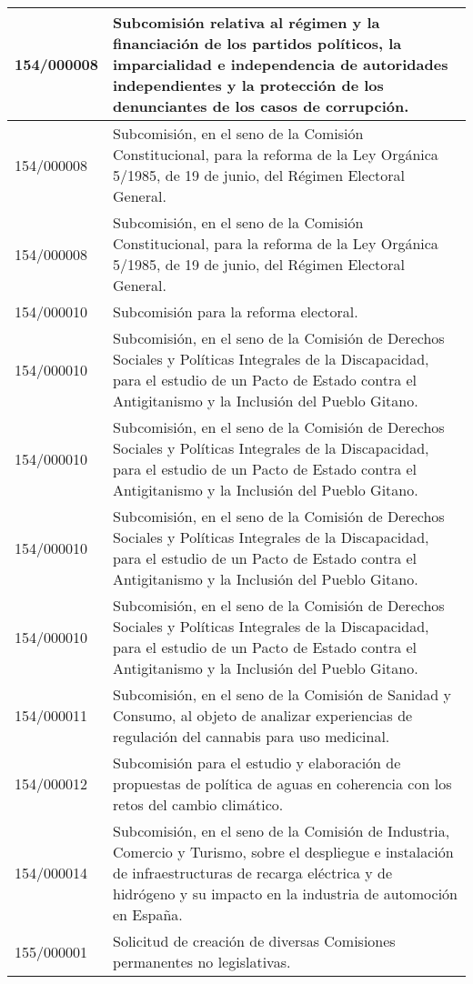 {\begin{table}[H]
\begin{center}
\begin{tabularx}{\linewidth}{| l | X |}
\hline
154/000008 & Subcomisión relativa al régimen y la financiación de los partidos políticos, la imparcialidad e independencia de autoridades independientes y la protección de los denunciantes de los casos de corrupción. \\
\hline
154/000008 & Subcomisión, en el seno de la Comisión Constitucional, para la reforma de la Ley Orgánica 5/1985, de 19 de junio, del Régimen Electoral General. \\
\hline
154/000008 & Subcomisión, en el seno de la Comisión Constitucional, para la reforma de la Ley Orgánica 5/1985, de 19 de junio, del Régimen Electoral General. \\
\hline
154/000010 & Subcomisión para la reforma electoral. \\
\hline
154/000010 & Subcomisión, en el seno de la Comisión de Derechos Sociales y Políticas Integrales de la Discapacidad, para el estudio de un Pacto de Estado contra el Antigitanismo y la Inclusión del Pueblo Gitano. \\
\hline
154/000010 & Subcomisión, en el seno de la Comisión de Derechos Sociales y Políticas Integrales de la Discapacidad, para el estudio de un Pacto de Estado contra el Antigitanismo y la Inclusión del Pueblo Gitano. \\
\hline
154/000010 & Subcomisión, en el seno de la Comisión de Derechos Sociales y Políticas Integrales de la Discapacidad, para el estudio de un Pacto de Estado contra el Antigitanismo y la Inclusión del Pueblo Gitano. \\
\hline
154/000010 & Subcomisión, en el seno de la Comisión de Derechos Sociales y Políticas Integrales de la Discapacidad, para el estudio de un Pacto de Estado contra el Antigitanismo y la Inclusión del Pueblo Gitano. \\
\hline
154/000011 & Subcomisión, en el seno de la Comisión de Sanidad y Consumo, al objeto de analizar experiencias de regulación del cannabis para uso medicinal. \\
\hline
154/000012 & Subcomisión para el estudio y elaboración de propuestas de política de aguas en coherencia con los retos del cambio climático. \\
\hline
154/000014 & Subcomisión, en el seno de la Comisión de Industria, Comercio y Turismo, sobre el despliegue e instalación de infraestructuras de recarga eléctrica y de hidrógeno y su impacto en la industria de automoción en España. \\
\hline
155/000001 & Solicitud de creación de diversas Comisiones permanentes no legislativas. \\

\end{tabularx}
\end{center}
\end{table}}
